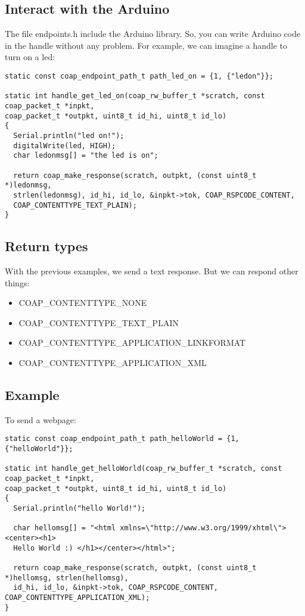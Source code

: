 \documentclass{article}
\begin{document}
\subsection{Interact with the Arduino}
The file endpoints.h include the Arduino library. So, you can write Arduino code in the handle without any problem. For example, we can imagine a handle to turn on a led:\\
\begin{verbatim}
static const coap_endpoint_path_t path_led_on = {1, {"ledon"}};

static int handle_get_led_on(coap_rw_buffer_t *scratch, const coap_packet_t *inpkt,
coap_packet_t *outpkt, uint8_t id_hi, uint8_t id_lo)
{
  Serial.println("led on!");
  digitalWrite(led, HIGH);
  char ledonmsg[] = "the led is on";  
  
  return coap_make_response(scratch, outpkt, (const uint8_t *)ledonmsg, 
  strlen(ledonmsg), id_hi, id_lo, &inpkt->tok, COAP_RSPCODE_CONTENT, 
  COAP_CONTENTTYPE_TEXT_PLAIN);
}
\end{verbatim}
\subsection{Return types}
With the previous examples, we send a text response. But we can respond other things:
\begin{itemize}
  \item COAP\_CONTENTTYPE\_NONE
  \item COAP\_CONTENTTYPE\_TEXT\_PLAIN
  \item COAP\_CONTENTTYPE\_APPLICATION\_LINKFORMAT
  \item COAP\_CONTENTTYPE\_APPLICATION\_XML
\end{itemize}
\subsection{Example}
To send a webpage:\\
\begin{verbatim}
static const coap_endpoint_path_t path_helloWorld = {1, {"helloWorld"}};

static int handle_get_helloWorld(coap_rw_buffer_t *scratch, const coap_packet_t *inpkt,
coap_packet_t *outpkt, uint8_t id_hi, uint8_t id_lo)
{
  Serial.println("hello World!");
  
  char hellomsg[] = "<html xmlns=\"http://www.w3.org/1999/xhtml\"><center><h1>
  Hello World :) </h1></center></html>";
  
  return coap_make_response(scratch, outpkt, (const uint8_t *)hellomsg, strlen(hellomsg), 
  id_hi, id_lo, &inpkt->tok, COAP_RSPCODE_CONTENT, COAP_CONTENTTYPE_APPLICATION_XML);
}
\end{verbatim}
\end{document}
